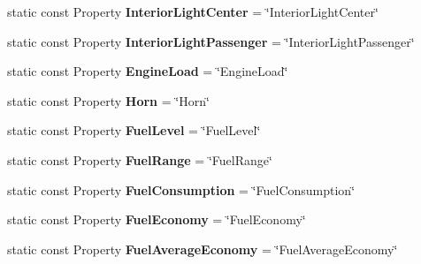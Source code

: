 \begin{DoxyCompactItemize}
\item 
\hypertarget{classVehicleProperty_a86c0bb4ab676e06e3c807d90c92e7240}{static const Property {\bfseries Interior\-Light\-Center} = \char`\"{}Interior\-Light\-Center\char`\"{}}\label{classVehicleProperty_a86c0bb4ab676e06e3c807d90c92e7240}

\item 
\hypertarget{classVehicleProperty_af60682429c3b2c7517715801d4ac0f92}{static const Property {\bfseries Interior\-Light\-Passenger} = \char`\"{}Interior\-Light\-Passenger\char`\"{}}\label{classVehicleProperty_af60682429c3b2c7517715801d4ac0f92}

\item 
\hypertarget{classVehicleProperty_a89cb1e6e8dcb7910270c333d79200665}{static const Property {\bfseries Engine\-Load} = \char`\"{}Engine\-Load\char`\"{}}\label{classVehicleProperty_a89cb1e6e8dcb7910270c333d79200665}

\item 
\hypertarget{classVehicleProperty_a69370e86d3520734d83a4c154b533642}{static const Property {\bfseries Horn} = \char`\"{}Horn\char`\"{}}\label{classVehicleProperty_a69370e86d3520734d83a4c154b533642}

\item 
\hypertarget{classVehicleProperty_a9bfbe5beb9e13c8de62c7514b3b22fc9}{static const Property {\bfseries Fuel\-Level} = \char`\"{}Fuel\-Level\char`\"{}}\label{classVehicleProperty_a9bfbe5beb9e13c8de62c7514b3b22fc9}

\item 
\hypertarget{classVehicleProperty_ae0c98c8cbfb6b8553faabfb9d4a42b35}{static const Property {\bfseries Fuel\-Range} = \char`\"{}Fuel\-Range\char`\"{}}\label{classVehicleProperty_ae0c98c8cbfb6b8553faabfb9d4a42b35}

\item 
\hypertarget{classVehicleProperty_afdc1b7b9ecf211d26221b155aef9a35a}{static const Property {\bfseries Fuel\-Consumption} = \char`\"{}Fuel\-Consumption\char`\"{}}\label{classVehicleProperty_afdc1b7b9ecf211d26221b155aef9a35a}

\item 
\hypertarget{classVehicleProperty_af34bb142d87eb300ce82e112598d5376}{static const Property {\bfseries Fuel\-Economy} = \char`\"{}Fuel\-Economy\char`\"{}}\label{classVehicleProperty_af34bb142d87eb300ce82e112598d5376}

\item 
\hypertarget{classVehicleProperty_aa453a0e6b9edee8da30b1f5b9a32edeb}{static const Property {\bfseries Fuel\-Average\-Economy} = \char`\"{}Fuel\-Average\-Economy\char`\"{}}\label{classVehicleProperty_aa453a0e6b9edee8da30b1f5b9a32edeb}


\end{DoxyCompactItemize}
